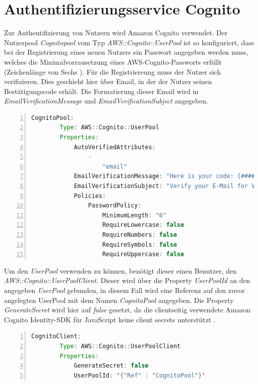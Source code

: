 \documentclass[a4paper, 12pt]{scrreprt}
\renewcommand\_{\textunderscore\allowbreak}
\begin{document}
\section{Authentifizierungsservice Cognito}
Zur Authentifizierung von Nutzern wird Amazon Cognito verwendet. Der Nutzerpool \textit{Cognitopool} vom Typ \textit{AWS::Cognito::UserPool} ist so konfiguriert, dass bei der Registrierung eines neuen Nutzers ein Passwort angegeben werden muss, welches die Minimalvorrausetzung eines AWS-Cognito-Passworts erfüllt (Zeichenlänge von Sechs \cite{AWSD}). Für die Registriereung muss der Nutzer sich verifizieren. Dies geschieht hier über Email, in der der Nutzer seinen Bestätigungscode erhält. Die Formatierung dieser Email wird in \textit{EmailVerificationMessage} und \textit{EmailVerificationSubject} angegeben.  
\bigskip
\begin{lstlisting}[xleftmargin=\parindent,numbers=left,numberstyle=\small,numbersep=8pt,frame=L,mathescape=true, basicstyle=\small, language=Java, lineskip={1.0pt}]
CognitoPool:
        Type: AWS::Cognito::UserPool
        Properties:
            AutoVerifiedAttributes:
                -
                    "email"
            EmailVerificationMessage: "Here is your code: {####}"
            EmailVerificationSubject: "Verify your E-Mail for VD"
            Policies:
                PasswordPolicy:
                    MinimumLength: "6"
                    RequireLowercase: false
                    RequireNumbers: false
                    RequireSymbols: false
                    RequireUppercase: false

\end{lstlisting}
\bigskip
\noindent Um den \textit{UserPool} verwenden zu können, benötigt dieser einen Benutzer, den \textit{AWS::Cognito::UserPoolClient}. Dieser wird über die Property \textit{UserPoolId} an den angegeben \textit{UserPool} gebunden, in diesem Fall wird eine Referenz auf den zuvor angelegten UserPool mit dem Namen \textit{CognitoPool} angegeben. Die Property \textit{GenerateSecret} wird hier auf \textit{false} gesetzt, da die clientseitig verwendete Amazon Cognito Identity-SDK für JavaScript keine client secrets unterstützt \cite{AWSAmplify}.
\bigskip
\begin{lstlisting}[xleftmargin=\parindent,numbers=left,numberstyle=\small,numbersep=8pt,frame=L,mathescape=true, basicstyle=\small, language=Java, lineskip={1.0pt}]
    CognitoClient:
        Type: AWS::Cognito::UserPoolClient
        Properties:
            GenerateSecret: false
            UserPoolId: '{"Ref" : "CognitoPool"}'
\end{lstlisting} 
\end{document}
